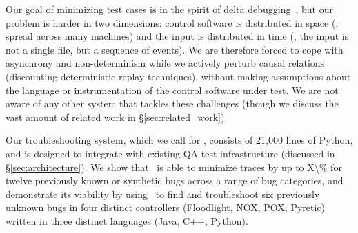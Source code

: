 Our goal of minimizing test cases is in the spirit of
delta debugging~\cite{Zeller:1999:YMP:318773.318946}, but our
problem is harder in two dimensions: control software is distributed in space (\ie,
spread across many machines) and the input is distributed in time (\ie, the
input is not a single file, but a sequence of events).
We are therefore forced to cope with asynchrony and non-determinism while
we actively perturb causal relations (discounting deterministic replay
techniques), without making assumptions about the language
or instrumentation of the control software under test.
We are not aware of any other system that tackles these
challenges (though we discuss the vast amount of related work in \S\ref{sec:related_work}).

Our troubleshooting system, which we call {\projectname} for \projectmeaning,
consists of 21,000 lines of Python, and is designed to
integrate with existing QA test infrastructure (discussed in
\S\ref{sec:architecture}). We show that \projectname~is able
to minimize traces by up to \num{X\%} for \num{twelve}
previously known or synthetic bugs across a range of bug categories,
and demonstrate its viability by using \projectname~to find and
troubleshoot \num{six} previously unknown bugs in four distinct
controllers (Floodlight, NOX, POX, Pyretic) written in three distinct
languages (Java, C++, Python).
